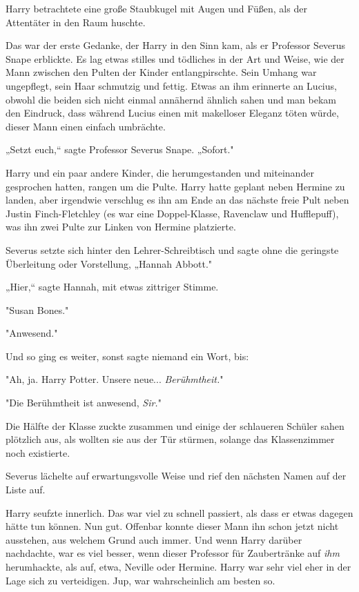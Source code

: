 {Harry betrachtete eine große Staubkugel mit Augen und Füßen, als der Attentäter in den Raum huschte.

Das war der erste Gedanke, der Harry in den Sinn kam, als er Professor Severus Snape erblickte. Es lag etwas stilles und tödliches in der Art und Weise, wie der Mann zwischen den Pulten der Kinder entlangpirschte. Sein Umhang war ungepflegt, sein Haar schmutzig und fettig. Etwas an ihm erinnerte an Lucius, obwohl die beiden sich nicht einmal annähernd ähnlich sahen und man bekam den Eindruck, dass während Lucius einen mit makelloser Eleganz töten würde, dieser Mann einen einfach umbrächte.

„Setzt euch,“ sagte Professor Severus Snape. „Sofort."

Harry und ein paar andere Kinder, die herumgestanden und miteinander gesprochen hatten, rangen um die Pulte. Harry hatte geplant neben Hermine zu landen, aber irgendwie verschlug es ihn am Ende an das nächste freie Pult neben Justin Finch-Fletchley (es war eine Doppel-Klasse, Ravenclaw und Hufflepuff), was ihn zwei Pulte zur Linken von Hermine platzierte.

Severus setzte sich hinter den Lehrer-Schreibtisch und sagte ohne die geringste Überleitung oder Vorstellung, „Hannah Abbott."

„Hier,“ sagte Hannah, mit etwas zittriger Stimme.

"Susan Bones."

"Anwesend."

Und so ging es weiter, sonst sagte niemand ein Wort, bis:

"Ah, ja. Harry Potter. Unsere neue... \emph{Berühmtheit.}"

"Die Berühmtheit ist anwesend, \emph{Sir.}"

Die Hälfte der Klasse zuckte zusammen und einige der schlaueren Schüler sahen plötzlich aus, als wollten sie aus der Tür stürmen, solange das Klassenzimmer noch existierte.

Severus lächelte auf erwartungsvolle Weise und rief den nächsten Namen auf der Liste auf.

Harry seufzte innerlich. Das war viel zu schnell passiert, als dass er etwas dagegen hätte tun können. Nun gut. Offenbar konnte dieser Mann ihn schon jetzt nicht ausstehen, aus welchem Grund auch immer. Und wenn Harry darüber nachdachte, war es viel besser, wenn dieser Professor für Zaubertränke auf \emph{ihm} herumhackte, als auf, etwa, Neville oder Hermine. Harry war sehr viel eher in der Lage sich zu verteidigen. Jup, war wahrscheinlich am besten so.

}
